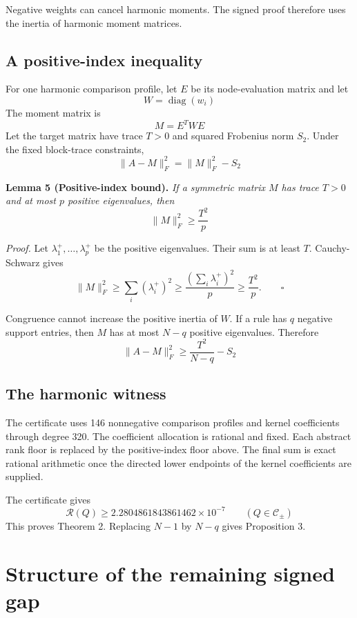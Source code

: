 \documentclass[11pt]{article}
\begin{document}
Negative weights can cancel harmonic moments. The signed proof therefore
uses the inertia of harmonic moment matrices.

\subsection{A positive-index
inequality}\label{a-positive-index-inequality}

For one harmonic comparison profile, let \(E\) be its node-evaluation
matrix and let \[
W=\operatorname{diag}(w_i)
\] The moment matrix is \[
M=E^TWE
\] Let the target matrix have trace \(T>0\) and squared Frobenius norm
\(S_2\). Under the fixed block-trace constraints, \[
\lVert A-M\rVert_F^2=\lVert M\rVert_F^2-S_2
\]

\textbf{Lemma 5 (Positive-index bound).} \emph{If a symmetric matrix
\(M\) has trace \(T>0\) and at most \(p\) positive eigenvalues, then} \[
\lVert M\rVert_F^2\geq\frac{T^2}{p}
\]

\emph{Proof.} Let \(\lambda_1^+,\ldots,\lambda_p^+\) be the positive
eigenvalues. Their sum is at least \(T\). Cauchy-Schwarz gives \[
\lVert M\rVert_F^2
\geq\sum_i(\lambda_i^+)^2
\geq\frac{(\sum_i\lambda_i^+)^2}{p}
\geq\frac{T^2}{p}.
\qquad\square
\]

Congruence cannot increase the positive inertia of \(W\). If a rule has
\(q\) negative support entries, then \(M\) has at most \(N-q\) positive
eigenvalues. Therefore \[
\lVert A-M\rVert_F^2
\geq\frac{T^2}{N-q}-S_2
\]

\subsection{The harmonic witness}\label{the-harmonic-witness}

The certificate uses 146 nonnegative comparison profiles and kernel
coefficients through degree 320. The coefficient allocation is rational
and fixed. Each abstract rank floor is replaced by the positive-index
floor above. The final sum is exact rational arithmetic once the
directed lower endpoints of the kernel coefficients are supplied.

The certificate gives \[
\mathcal{R}(Q)
\geq 2.2804861843861462\times10^{-7}
\qquad (Q\in\mathcal{C}_{\pm})
\] This proves Theorem 2. Replacing \(N-1\) by \(N-q\) gives Proposition
3.

\section{Structure of the remaining signed
gap}\label{structure-of-the-remaining-signed-gap}
\end{document}
